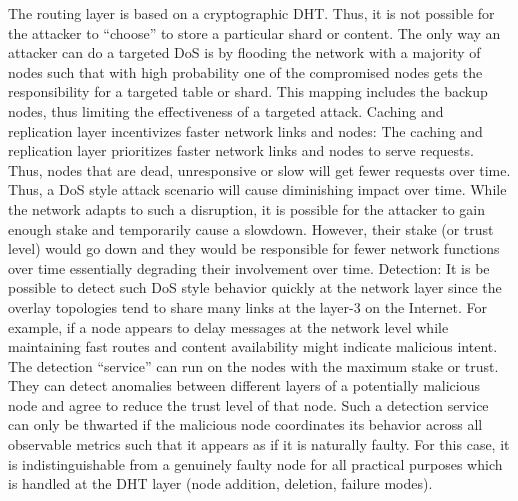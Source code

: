 The routing layer is based on a cryptographic DHT. Thus, it is not possible for the attacker to “choose” to store a particular shard or content. The only way an attacker can do a targeted DoS is by flooding the network with a majority of nodes such that with high probability one of the compromised nodes gets the responsibility for a targeted table or shard. This mapping includes the backup nodes, thus limiting the effectiveness of a targeted attack.
Caching and replication layer incentivizes faster network links and nodes:
The caching and replication layer prioritizes faster network links and nodes to serve requests. Thus, nodes that are dead, unresponsive or slow will get fewer requests over time. Thus, a DoS style attack scenario will cause diminishing impact over time.
While the network adapts to such a disruption, it is possible for the attacker to gain enough stake and temporarily cause a slowdown.
However, their stake (or trust level) would go down and they would be responsible for fewer network functions over time essentially degrading their involvement over time.	
Detection: It is be possible to detect such DoS style behavior quickly at the network layer since the overlay topologies tend to share many links at the layer-3 on the Internet. For example, if a node appears to delay messages at the network level while maintaining fast routes and content availability might indicate malicious intent.
The detection “service” can run on the nodes with the maximum stake or trust. They can detect anomalies between different layers of a potentially malicious node and agree to reduce the trust level of that node.
Such a detection service can only be thwarted if the malicious node coordinates its behavior across all observable metrics such that it appears as if it is naturally faulty. For this case, it is indistinguishable from a genuinely faulty node for all practical purposes which is handled at the DHT layer (node addition, deletion, failure modes).
